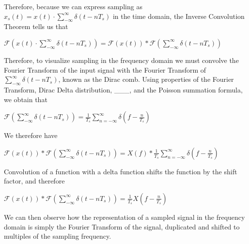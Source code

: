 \documentclass{article}
\begin{document}
Therefore, because we can express sampling as $x_s(t) = x(t) \cdot \sum_{-\infty}^{\infty} \delta (t-nT_s)$ in the time domain, the Inverse Convolution Theorem tells us that %
\begin{center}
    \begin{math}
        \mathcal{F}\left(x(t) \cdot \sum_{-\infty}^{\infty} \delta (t-nT_s)\right) = \mathcal{F}(x(t)) * \mathcal{F}\left( \sum_{-\infty}^{\infty} \delta (t-nT_s) \right)
    \end{math}  
\end{center}

Therefore, to visualize sampling in the frequency domain we must convolve the Fourier Transform of the input signal with the Fourier Transform of $\sum_{-\infty}^{\infty} \delta (t-nT_s)$, known as the Dirac comb. %
Using properties of the Fourier Transform, Dirac Delta distribution, \_\_\_, %
and the Poisson summation formula, 
we obtain that 
\begin{center}
    \begin{math}
        \mathcal{F}\left(\sum_{-\infty}^{\infty} \delta (t-nT_s)\right) = \frac{1}{T_s} \sum_{n = -\infty}^{\infty} \delta \left( f - \frac{n}{T_s} \right)
    \end{math}  
\end{center}
We therefore have
\begin{center}
    \begin{math}
        \mathcal{F}(x(t)) * \mathcal{F}\left( \sum_{-\infty}^{\infty} \delta (t-nT_s) \right) = X(f) * \frac{1}{T_s} \sum_{n = -\infty}^{\infty} \delta \left( f - \frac{n}{T_s} \right)
    \end{math}  
\end{center}
Convolution of a function with a delta function shifts the function by the shift factor, and therefore %
\begin{center}
    \begin{math}
        \mathcal{F}(x(t)) * \mathcal{F}\left( \sum_{-\infty}^{\infty} \delta (t-nT_s) \right) = \frac{1}{T_s} X\left(f - \frac{n}{T_s} \right)
    \end{math}  
\end{center}
We can then observe how the representation of a sampled signal in the frequency domain is simply the Fourier Transform of the signal, duplicated and shifted to multiples of the sampling frequency. %
\end{document}
